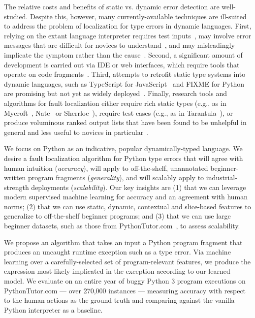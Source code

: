 \documentclass[conference]{IEEEtran}
\begin{document}
The relative costs and benefits of static vs. dynamic error detection are
well-studied. Despite this, however, many currently-available techniques
are ill-suited to address the problem of localization for type errors in
dynamic languages. First, relying on the extant language interpreter
requires test inputs~\cite{FIXME}, may involve error messages that are
difficult for novices to understand~\cite{FIXME}, and may misleadingly
implicate the symptom rather than the cause~\cite{FIXME}.  Second, a
significant amount of development is carried out via IDE or web interfaces,
which require tools that operate on code fragments~\cite{Guo2013-vu}.
Third, attempts to retrofit static type systems into dynamic languages,
such as TypeScript for JavaScript~\cite{FIXME} and FIXME for
Python~\cite{FIXME} are promising but not yet as widely
deployed~\cite{FIXME}. Finally, research tools and algorithms for fault
localization either require rich static types (e.g., as in
Mycroft~\cite{FIXME}, Nate~\cite{FIXME} or Sherrloc~\cite{FIXME}), require
test cases (e.g., as in Tarantula~\cite{FIXME}), or produce voluminous
ranked output lists that have been found to be unhelpful in general and
less useful to novices in particular~\cite[Sec.~5.1]{orso-parnin}. 

We focus on Python as an indicative, popular dynamically-typed language.
We desire a fault localization algorithm for Python type errors that
will agree with human intuition (\emph{accuracy}), will apply to
off-the-shelf, unannotated beginner-written program fragments
(\emph{generality}), and will scalably apply to industrial-strength
deployments (\emph{scalability}). Our key insights are (1) that we can leverage
modern supervised machine learning for accuracy and an agreement with human
norms; (2) that we can use static, dynamic, contextual and slice-based
features to generalize to off-the-shelf beginner programs; and (3) that we
can use large beginner datasets, such as those from
PythonTutor.com~\cite{Guo2012-vu}, to assess scalability.

We propose an algorithm that takes an input a Python program fragment that 
produces an uncaught runtime exception such as a type error. Via machine
learning over a carefully-selected set of program-relevant features, we
produce the expression most likely implicated in the exception according to
our learned model. We evaluate on an entire year of buggy Python 3 program
executions on PythonTutor.com --- over 270,000 instances --- measuring
accuracy with respect to the human actions as the ground truth and
comparing against the vanilla Python interpreter as a baseline. 
\end{document}
